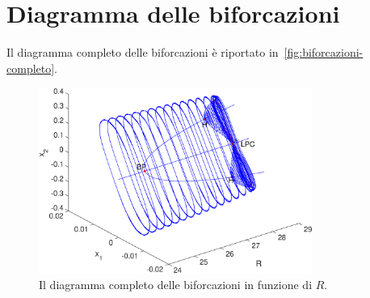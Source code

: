 \section{Diagramma delle biforcazioni}

Il diagramma completo delle biforcazioni è riportato in~\autoref{fig:biforcazioni-completo}.

\begin{figure}
\centering
\includegraphics[width=0.8\textwidth]{matcont/BiforcazioniCompleto}
\caption{Il diagramma completo delle biforcazioni in funzione di $R$.}
\label{fig:biforcazioni-completo}
\end{figure}
